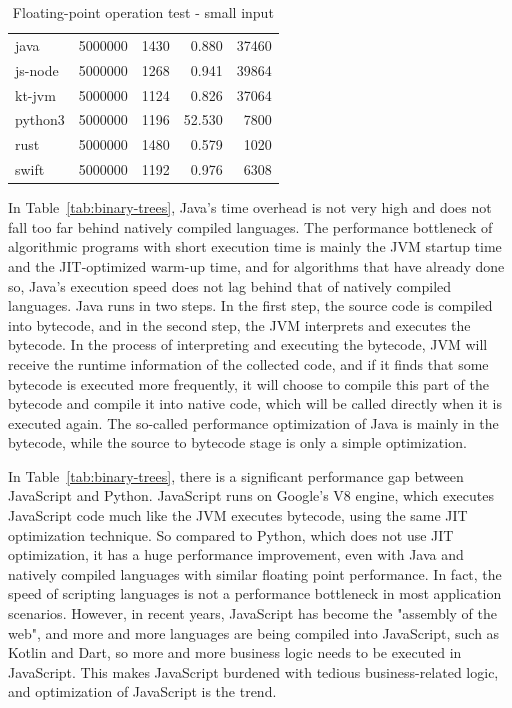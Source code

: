 \begin{table}[htbp]
\begin{subtable}[h]{0.495\linewidth}
\begin{tabular}{lrrrr}
            java      & 5000000 & 1430    & 0.880  & 37460   \\
            js-node   & 5000000 & 1268    & 0.941  & 39864   \\
            kt-jvm    & 5000000 & 1124    & 0.826  & 37064   \\
            python3   & 5000000 & 1196    & 52.530 & 7800    \\
            rust      & 5000000 & 1480    & 0.579  & 1020    \\
            swift     & 5000000 & 1192    & 0.976  & 6308    \\
            \bottomrule
        \end{tabular}
        \caption{Floating-point operation test - small input}
        \label{tab:n-body-2}
    \end{subtable}
\end{table}


In Table~\ref{tab:binary-trees},
Java's time overhead is not very high and does not fall too far behind natively compiled languages. The performance bottleneck of algorithmic programs with short execution time is mainly the JVM startup time and the JIT-optimized warm-up time, and for algorithms that have already done so, Java's execution speed does not lag behind that of natively compiled languages. Java runs in two steps. In the first step, the source code is compiled into bytecode, and in the second step, the JVM interprets and executes the bytecode. In the process of interpreting and executing the bytecode, JVM will receive the runtime information of the collected code, and if it finds that some bytecode is executed more frequently, it will choose to compile this part of the bytecode and compile it into native code, which will be called directly when it is executed again. The so-called performance optimization of Java is mainly in the bytecode, while the source to bytecode stage is only a simple optimization.

In Table~\ref{tab:binary-trees},
there is a significant performance gap between JavaScript and Python. JavaScript runs on Google's V8 engine, which executes JavaScript code much like the JVM executes bytecode, using the same JIT optimization technique. So compared to Python, which does not use JIT optimization, it has a huge performance improvement, even with Java and natively compiled languages with similar floating point performance. In fact, the speed of scripting languages is not a performance bottleneck in most application scenarios. However, in recent years, JavaScript has become the "assembly of the web", and more and more languages are being compiled into JavaScript, such as Kotlin and Dart, so more and more business logic needs to be executed in JavaScript. This makes JavaScript burdened with tedious business-related logic, and optimization of JavaScript is the trend.

